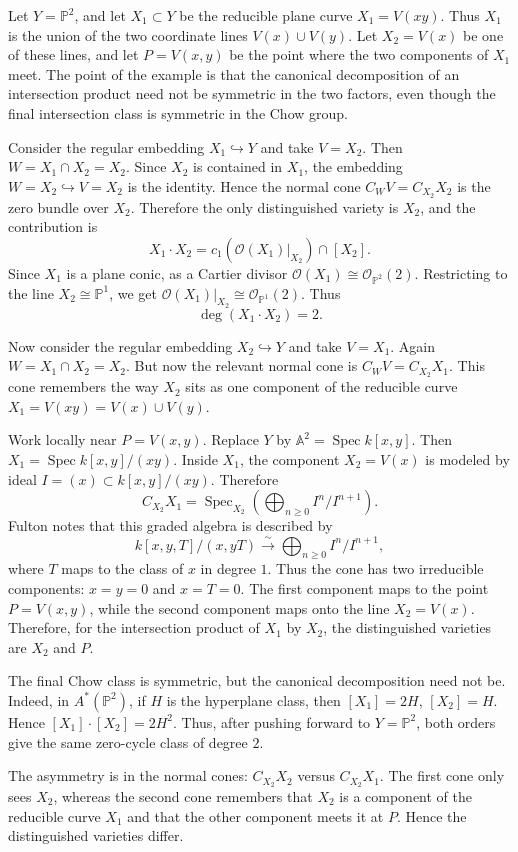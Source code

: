 \documentclass[12pt]{article}
\begin{document}
\begin{example}
Let $Y=\mathbb P^2$, and let $X_1\subset Y$ be the reducible plane curve $X_1=V(xy)$. Thus $X_1$ is the union of the two coordinate lines $V(x)\cup V(y)$. Let $X_2=V(x)$ be one of these lines, and let $P=V(x,y)$ be the point where the two components of $X_1$ meet. The point of the example is that the canonical decomposition of an intersection product need not be symmetric in the two factors, even though the final intersection class is symmetric in the Chow group.

Consider the regular embedding $X_1\hookrightarrow Y$ and take $V=X_2$. Then $W=X_1\cap X_2=X_2$. Since $X_2$ is contained in $X_1$, the embedding $W=X_2\hookrightarrow V=X_2$ is the identity. Hence the normal cone $C_WV=C_{X_2}X_2$ is the zero bundle over $X_2$. Therefore the only distinguished variety is $X_2$, and the contribution is
$$X_1\cdot X_2 = c_1(\mathcal O(X_1)|_{X_2})\cap [X_2].$$
Since $X_1$ is a plane conic, as a Cartier divisor $\mathcal O(X_1)\cong \mathcal O_{\mathbb P^2}(2)$. Restricting to the line $X_2\cong \mathbb P^1$, we get $\mathcal O(X_1)|_{X_2}\cong \mathcal O_{\mathbb P^1}(2)$. Thus
$$\deg(X_1\cdot X_2)=2.$$

Now consider the regular embedding $X_2\hookrightarrow Y$ and take $V=X_1$. Again $W=X_1\cap X_2=X_2$. But now the relevant normal cone is $C_WV=C_{X_2}X_1$. This cone remembers the way $X_2$ sits as one component of the reducible curve $X_1=V(xy)=V(x)\cup V(y)$.

Work locally near $P=V(x,y)$. Replace $Y$ by $\mathbb A^2=\operatorname{Spec}k[x,y]$. Then $X_1=\operatorname{Spec} k[x,y]/(xy)$. Inside $X_1$, the component $X_2=V(x)$ is modeled by ideal $I=(x)\subset k[x,y]/(xy)$. Therefore
$$C_{X_2}X_1 = \operatorname{Spec}_{X_2}\left(\bigoplus_{n\geq 0} I^n/I^{n+1}\right).$$
Fulton notes that this graded algebra is described by
$$k[x,y,T]/(x,yT) \xrightarrow{\sim} \bigoplus_{n\geq 0} I^n/I^{n+1},$$
where $T$ maps to the class of $x$ in degree $1$. Thus the cone has two irreducible components: $x=y=0$ and $x=T=0$. The first component maps to the point $P=V(x,y)$, while the second component maps onto the line $X_2=V(x)$. Therefore, for the intersection product of $X_1$ by $X_2$, the distinguished varieties are $X_2$ and $P$.

The final Chow class is symmetric, but the canonical decomposition need not be. Indeed, in $A^*(\mathbb P^2)$, if $H$ is the hyperplane class, then $[X_1]=2H$, $[X_2]=H$. Hence $[X_1]\cdot [X_2]=2H^2$. Thus, after pushing forward to $Y=\mathbb P^2$, both orders give the same zero-cycle class of degree $2$.

The asymmetry is in the normal cones: $C_{X_2}X_2$ versus $C_{X_2}X_1$. The first cone only sees $X_2$, whereas the second cone remembers that $X_2$ is a component of the reducible curve $X_1$ and that the other component meets it at $P$. Hence the distinguished varieties differ.
\end{example}
\end{document}

